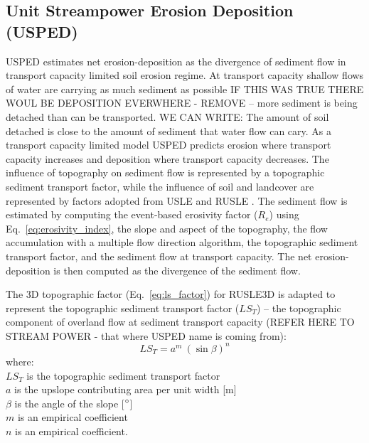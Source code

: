 \documentclass[gmd, manuscript]{copernicus}
\begin{document}
\subsection{Unit Streampower Erosion Deposition (USPED)} \label{usped_model}
USPED estimates net erosion-deposition as the divergence of sediment flow
in transport capacity limited soil erosion regime.
At transport capacity shallow flows of water are carrying as much sediment as possible 
IF THIS WAS TRUE THERE WOUL BE DEPOSITION EVERWHERE - REMOVE
-- more sediment is being detached 
than can be transported.
WE CAN WRITE: The amount of soil detached is close to the amount of sediment that water flow can cary.
As a transport capacity limited model
USPED predicts erosion where transport capacity increases
and deposition where transport capacity decreases. 
The influence of topography on sediment flow  
is represented by a topographic sediment transport factor,
while the influence of soil and landcover are represented by 
factors adopted from USLE and RUSLE
\citep{Mitasova1996}.
%
The sediment flow is estimated by computing
the event-based erosivity factor ($R_e$) 
using Eq.~\ref{eq:erosivity_index},
the slope and aspect of the topography,
the flow accumulation with a multiple flow direction algorithm,
the topographic sediment transport factor,
and the sediment flow at transport capacity.
The net erosion-deposition is then computed as the divergence of the sediment flow. 

The 3D topographic factor (Eq.~\ref{eq:ls_factor}) 
for RUSLE3D is adapted to represent 
the topographic sediment transport factor ($LS_T$) --
the topographic component 
of overland flow at sediment transport capacity (REFER HERE TO STREAM POWER - that where USPED name is coming from):
%
\begin{equation}
\label{eq:lst_factor}
{LS_T = a^{m} ~ (\sin \beta)^{n}}
\end{equation}
%
{\small
\noindent
where: \\
\noindent
\hspace*{0.5em} $LS_T$ is the topographic sediment transport factor\\
\hspace*{0.5em} $a$ is the upslope contributing area per unit width [m]\\
\hspace*{0.5em} $\beta$ is the angle of the slope [$^{\circ}$]\\
\hspace*{0.5em} $m$ is an empirical coefficient\\
\hspace*{0.5em} $n$ is an empirical coefficient.\\
}
\end{document}

